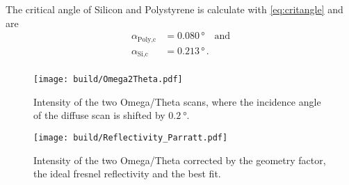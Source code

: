 The critical angle of Silicon and Polystyrene is calculate with \autoref{eq:critangle} and are
\begin{align*}
    \alpha_{\text{Poly}, \text{c}}  &=    0.080 \, \unit{\degree}   \quad \text{and} \\
    \alpha_{\text{Si}, \text{c}}    &=     0.213\, \unit{\degree} \,.    \\
\end{align*}



\begin{figure}[H]
    \centering
    \texttt{[image: build/Omega2Theta.pdf]}
    \caption{Intensity of the two Omega/Theta scans, where the incidence angle of the diffuse scan is shifted by $\SI{0.2}{\degree}$.} 
    \label{fig:Omega2Theta1}
\end{figure}

\begin{figure}[H]
    \centering
    \texttt{[image: build/Reflectivity\_Parratt.pdf]}
    \caption{Intensity of the two Omega/Theta corrected by the geometry factor, the ideal fresnel reflectivity and the best fit.} 
    \label{fig:Omega2Theta2}
\end{figure}

